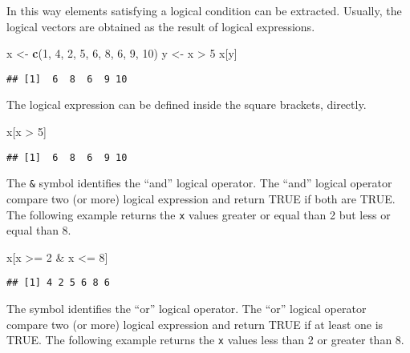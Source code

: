 \documentclass[]{book}
\newenvironment{Shaded}{\begin{snugshade}}{\end{snugshade}}
\newcommand{\KeywordTok}[1]{\textcolor[rgb]{0.13,0.29,0.53}{\textbf{{#1}}}}
\newcommand{\DecValTok}[1]{\textcolor[rgb]{0.00,0.00,0.81}{{#1}}}
\newcommand{\StringTok}[1]{\textcolor[rgb]{0.31,0.60,0.02}{{#1}}}
\newcommand{\NormalTok}[1]{{#1}}
\begin{document}
In this way elements satisfying a logical condition can be extracted.
Usually, the logical vectors are obtained as the result of logical
expressions.

\begin{Shaded}
\begin{Highlighting}[]
\NormalTok{x <-}\StringTok{ }\KeywordTok{c}\NormalTok{(}\DecValTok{1}\NormalTok{, }\DecValTok{4}\NormalTok{, }\DecValTok{2}\NormalTok{, }\DecValTok{5}\NormalTok{, }\DecValTok{6}\NormalTok{, }\DecValTok{8}\NormalTok{, }\DecValTok{6}\NormalTok{, }\DecValTok{9}\NormalTok{, }\DecValTok{10}\NormalTok{)}
\NormalTok{y <-}\StringTok{ }\NormalTok{x >}\StringTok{ }\DecValTok{5}
\NormalTok{x[y]}
\end{Highlighting}
\end{Shaded}

\begin{verbatim}
## [1]  6  8  6  9 10
\end{verbatim}

The logical expression can be defined inside the square brackets,
directly.

\begin{Shaded}
\begin{Highlighting}[]
\NormalTok{x[x >}\StringTok{ }\DecValTok{5}\NormalTok{]}
\end{Highlighting}
\end{Shaded}

\begin{verbatim}
## [1]  6  8  6  9 10
\end{verbatim}

The \texttt{\&} symbol identifies the ``and'' logical operator. The
``and'' logical operator compare two (or more) logical expression and
return TRUE if both are TRUE. The following example returns the
\texttt{x} values greater or equal than 2 but less or equal than 8.

\begin{Shaded}
\begin{Highlighting}[]
\NormalTok{x[x >=}\StringTok{ }\DecValTok{2} \NormalTok{&}\StringTok{ }\NormalTok{x <=}\StringTok{ }\DecValTok{8}\NormalTok{]}
\end{Highlighting}
\end{Shaded}

\begin{verbatim}
## [1] 4 2 5 6 8 6
\end{verbatim}

The \texttt{\textbar{}} symbol identifies the ``or'' logical operator.
The ``or'' logical operator compare two (or more) logical expression and
return TRUE if at least one is TRUE. The following example returns the
\texttt{x} values less than 2 or greater than 8.
\end{document}
